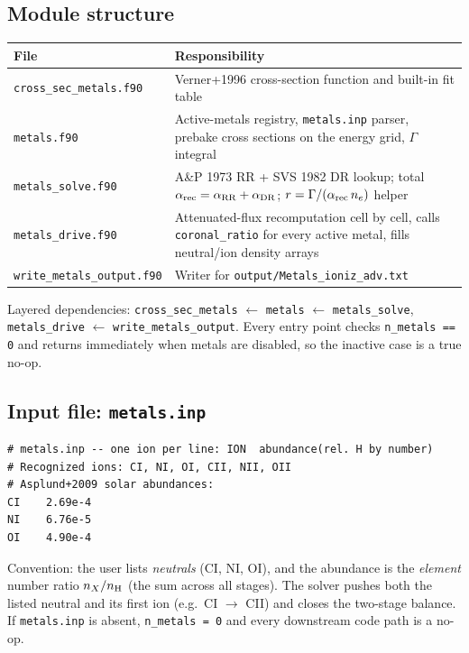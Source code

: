 \documentclass[english,a4paper]{my_memo}
\begin{document}
\subsection{Module structure}

\begin{center}
\begin{tabular}{|l|p{8.5cm}|}
\hline
File & Responsibility \\
\hline
\texttt{cross\_sec\_metals.f90}
   & Verner+1996 cross-section function and built-in fit table \\
\texttt{metals.f90}
   & Active-metals registry, \texttt{metals.inp} parser, prebake
     cross sections on the energy grid, $\Gamma$ integral \\
\texttt{metals\_solve.f90}
   & A\&P 1973 RR + SVS 1982 DR lookup; total
     $\alpha_{\rm rec} = \alpha_{\rm RR} + \alpha_{\rm DR}$;
     $r = \Gamma / (\alpha_{\rm rec}\,n_e)$ helper \\
\texttt{metals\_drive.f90}
   & Attenuated-flux recomputation cell by cell, calls
     \texttt{coronal\_ratio} for every active metal, fills neutral/ion
     density arrays \\
\texttt{write\_metals\_output.f90}
   & Writer for \texttt{output/Metals\_ioniz\_adv.txt} \\
\hline
\end{tabular}
\end{center}

Layered dependencies: \texttt{cross\_sec\_metals} $\leftarrow$
\texttt{metals} $\leftarrow$ \texttt{metals\_solve},
\texttt{metals\_drive} $\leftarrow$ \texttt{write\_metals\_output}. Every
entry point checks \texttt{n\_metals == 0} and returns immediately when
metals are disabled, so the inactive case is a true no-op.

\subsection{Input file: \texttt{metals.inp}}

\begin{verbatim}
# metals.inp -- one ion per line: ION  abundance(rel. H by number)
# Recognized ions: CI, NI, OI, CII, NII, OII
# Asplund+2009 solar abundances:
CI    2.69e-4
NI    6.76e-5
OI    4.90e-4
\end{verbatim}

Convention: the user lists \emph{neutrals} (CI, NI, OI), and the abundance
is the \emph{element} number ratio $n_X / n_{\rm H}$ (the sum across all
stages). The solver pushes both the listed neutral and its first ion
(e.g.\ CI $\to$ CII) and closes the two-stage balance. If
\texttt{metals.inp} is absent, \texttt{n\_metals = 0} and every downstream
code path is a no-op.
\end{document}
